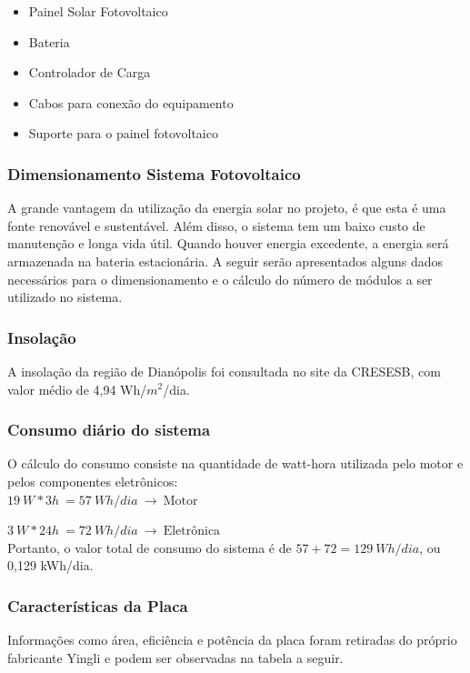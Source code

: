 \begin{itemize}
    \item Painel Solar Fotovoltaico
    \item Bateria
    \item Controlador de Carga
    \item Cabos para conexão do equipamento
    \item Suporte para o painel fotovoltaico

\end{itemize}

\subsubsection{Dimensionamento Sistema Fotovoltaico}
A grande vantagem da utilização da energia solar no projeto, é que esta é uma fonte renovável e sustentável. Além disso, o sistema tem um baixo custo de manutenção e longa vida útil. Quando houver energia excedente, a energia será armazenada na bateria estacionária. A seguir serão apresentados alguns dados necessários para o dimensionamento e o cálculo do número de módulos a ser utilizado no sistema.


\subsubsection*{Insolação}

A insolação da região de Dianópolis foi consultada no site da CRESESB, com valor médio de 4,94 Wh/$m^{2}$/dia.

\subsubsection*{Consumo diário do sistema}
O cálculo do consumo consiste na quantidade de watt-hora utilizada pelo motor e pelos componentes eletrônicos:
\\

$19~W*3h~=57~Wh/dia~\rightarrow~\text{Motor}$

$3~W*24h~=72~Wh/dia~\rightarrow~\text{Eletrônica}$
\\

Portanto, o valor total de consumo do sistema é de $57+72=129~Wh/dia$, ou 0,129 kWh/dia.

\subsubsection*{Características da Placa}
Informações como área, eficiência e potência da placa foram retiradas do próprio fabricante Yingli e podem ser observadas na tabela a seguir.

